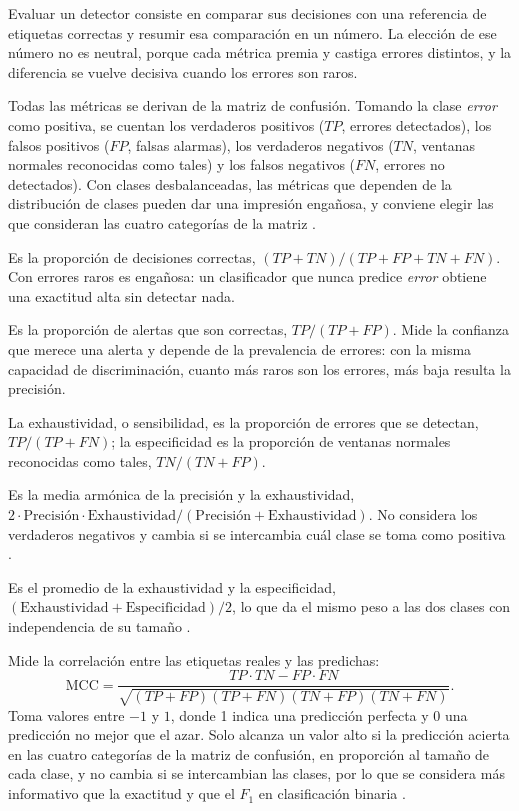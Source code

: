 Evaluar un detector consiste en comparar sus decisiones con una referencia de etiquetas correctas y resumir esa comparación en un número. La elección de ese número no es neutral, porque cada métrica premia y castiga errores distintos, y la diferencia se vuelve decisiva cuando los errores son raros.

Todas las métricas se derivan de la matriz de confusión. Tomando la clase \emph{error} como positiva, se cuentan los verdaderos positivos ($TP$, errores detectados), los falsos positivos ($FP$, falsas alarmas), los verdaderos negativos ($TN$, ventanas normales reconocidas como tales) y los falsos negativos ($FN$, errores no detectados). Con clases desbalanceadas, las métricas que dependen de la distribución de clases pueden dar una impresión engañosa, y conviene elegir las que consideran las cuatro categorías de la matriz \cite{diallo2025_metrics}.

Es la proporción de decisiones correctas, $(TP + TN)/(TP + FP + TN + FN)$. Con errores raros es engañosa: un clasificador que nunca predice \emph{error} obtiene una exactitud alta sin detectar nada.

Es la proporción de alertas que son correctas, $TP/(TP + FP)$. Mide la confianza que merece una alerta y depende de la prevalencia de errores: con la misma capacidad de discriminación, cuanto más raros son los errores, más baja resulta la precisión.

La exhaustividad, o sensibilidad, es la proporción de errores que se detectan, $TP/(TP + FN)$; la especificidad es la proporción de ventanas normales reconocidas como tales, $TN/(TN + FP)$.

Es la media armónica de la precisión y la exhaustividad, $2 \cdot \mathrm{Precisión} \cdot \mathrm{Exhaustividad} / (\mathrm{Precisión} + \mathrm{Exhaustividad})$. No considera los verdaderos negativos y cambia si se intercambia cuál clase se toma como positiva \cite{chicco2020_mcc}.

Es el promedio de la exhaustividad y la especificidad, $(\mathrm{Exhaustividad} + \mathrm{Especificidad})/2$, lo que da el mismo peso a las dos clases con independencia de su tamaño \cite{diallo2025_metrics}.

Mide la correlación entre las etiquetas reales y las predichas:
\begin{equation}
\mathrm{MCC} = \frac{TP \cdot TN - FP \cdot FN}{\sqrt{(TP+FP)(TP+FN)(TN+FP)(TN+FN)}}.
\end{equation}
Toma valores entre $-1$ y $1$, donde 1 indica una predicción perfecta y 0 una predicción no mejor que el azar. Solo alcanza un valor alto si la predicción acierta en las cuatro categorías de la matriz de confusión, en proporción al tamaño de cada clase, y no cambia si se intercambian las clases, por lo que se considera más informativo que la exactitud y que el $F_1$ en clasificación binaria \cite{chicco2020_mcc}.

